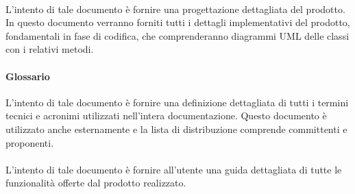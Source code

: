 \paragraph{\DDP}
L'intento di tale documento è fornire una progettazione dettagliata del 
prodotto. In questo documento verranno forniti tutti i dettagli implementativi 
del prodotto, fondamentali in fase di codifica, che comprenderanno diagrammi UML 
delle classi con i relativi metodi.
\paragraph{Glossario}
L'intento di tale documento è fornire una definizione dettagliata di tutti i 
termini tecnici e acronimi utilizzati nell'intera documentazione. Questo documento è 
utilizzato anche esternamente e la lista di distribuzione comprende committenti 
e proponenti.
\paragraph{\MU}
L'intento di tale documento è fornire all'utente una guida dettagliata di tutte 
le funzionalità offerte dal prodotto realizzato.
